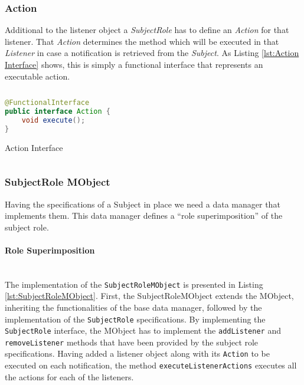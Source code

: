 \subsubsection{Action}
Additional to the listener object a \textit{SubjectRole} has to define an \textit{Action} for that listener.
That \textit{Action} determines the method which will be executed in that \textit{Listener} in case a notification is retrieved from the \textit{Subject}.
As Listing \ref{lst:Action Interface} shows, this is simply a functional interface that represents an executable action.

\begin{sourcecode} [H]
	\begin{lstlisting}[language=Java, escapechar=|]
@FunctionalInterface
public interface Action {
	void execute();
}
	\end{lstlisting}
	\caption{Action Interface}
	\label{lst:Action Interface}
\end{sourcecode}

\subsubsection{SubjectRole MObject}
Having the specifications of a Subject in place we need a data manager that implements them.
This data manager defines a ``role superimposition'' of the subject role.

\paragraph{Role Superimposition}\mbox{}\\
The implementation of the \texttt{SubjectRoleMObject} is presented in Listing \ref{lst:SubjectRoleMObject}.
First, the SubjectRoleMObject extends the MObject, inheriting the functionalities of the base data manager, followed by the implementation of the \texttt{SubjectRole} specifications.
By implementing the \texttt{SubjectRole} interface, the MObject has to implement the \texttt{addListener} and \texttt{removeListener} methods that have been provided by the subject role specifications.
Having added a listener object along with its \texttt{Action} to be executed on each notification, the method \texttt{executeListenerActions} executes all the actions for each of the listeners.

